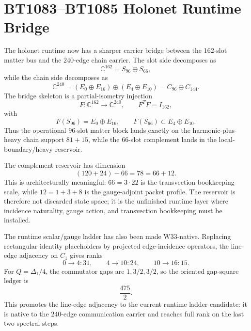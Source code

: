 \section{BT1083--BT1085 Holonet Runtime Bridge}
\label{sec:bt1083-bt1085-holonet-bridge}

The holonet runtime now has a sharper carrier bridge between the $162$-slot matter bus and the $240$-edge chain carrier.  The slot side decomposes as
\[
\mathbb C^{162}=S_{96}\oplus S_{66},
\]
while the chain side decomposes as
\[
\mathbb C^{240}=(E_0\oplus E_{16})\oplus(E_4\oplus E_{10})
= C_{96}\oplus C_{144}.
\]
The bridge skeleton is a partial-isometry injection
\[
F:\mathbb C^{162}\to\mathbb C^{240},
\qquad F^T F=I_{162},
\]
with
\[
F(S_{96})=E_0\oplus E_{16},
\qquad
F(S_{66})\subset E_4\oplus E_{10}.
\]
Thus the operational $96$-slot matter block lands exactly on the harmonic-plus-heavy chain support $81+15$, while the $66$-slot complement lands in the local-boundary/heavy reservoir.

The complement reservoir has dimension
\[
(120+24)-66=78=66+12.
\]
This is architecturally meaningful: $66=3\cdot22$ is the transvection bookkeeping scale, while $12=1+3+8$ is the gauge-adjoint packet profile.  The reservoir is therefore not discarded state space; it is the unfinished runtime layer where incidence naturality, gauge action, and transvection bookkeeping must be installed.

The runtime scalar/gauge ladder has also been made W33-native.  Replacing rectangular identity placeholders by projected edge-incidence operators, the line-edge adjacency on $C_1$ gives ranks
\[
0\to4:31,\qquad 4\to10:24,\qquad 10\to16:15.
\]
For $Q=\Delta_1/4$, the commutator gaps are $1,3/2,3/2$, so the oriented gap-square ledger is
\[
\frac{475}{2}.
\]
This promotes the line-edge adjacency to the current runtime ladder candidate: it is native to the $240$-edge communication carrier and reaches full rank on the last two spectral steps.
